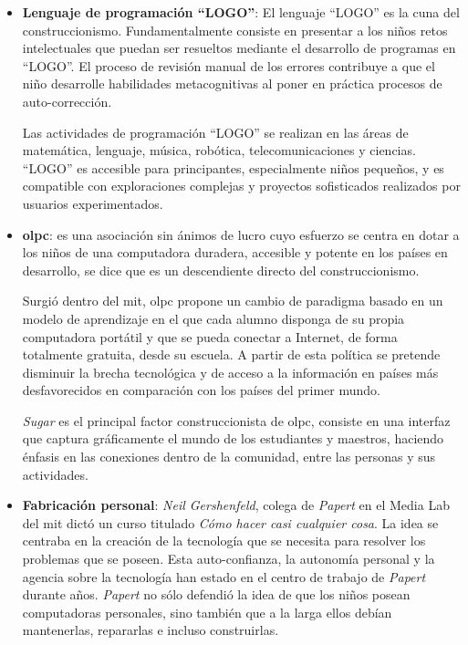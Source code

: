 \begin{itemize}

\item \textbf{Lenguaje de programación \enquote{LOGO}}: El lenguaje
    \enquote{LOGO} es la cuna del construccionismo. Fundamentalmente consiste en
    presentar a los niños retos intelectuales que puedan ser resueltos mediante
    el desarrollo de programas en \enquote{LOGO}. El proceso de revisión manual
    de los errores contribuye a que el niño desarrolle habilidades
    metacognitivas al poner en práctica procesos de
    auto-corrección\cite{logo:sg,ict:ttc}.

    Las actividades de programación \enquote{LOGO} se realizan en las áreas de
    matemática, lenguaje, música, robótica, telecomunicaciones y ciencias.
    \enquote{LOGO} es accesible para principantes, especialmente niños pequeños,
    y es compatible con exploraciones complejas y proyectos sofisticados
    realizados por usuarios experimentados\cite{logo:sg}.
    
\item \textbf{\Gls{olpc}}: es una asociación sin ánimos de lucro cuyo esfuerzo
    se centra en dotar a los niños de una computadora duradera, accesible y
    potente en los países en desarrollo, se dice que es un descendiente directo
    del construccionismo\cite{papertian:const}.
	
    Surgió dentro del \gls{mit}, \Gls{olpc} propone un cambio de paradigma
    basado en un modelo de aprendizaje en el que cada alumno disponga de su
    propia computadora portátil y que se pueda conectar a Internet, de forma
    totalmente gratuita, desde su escuela. A partir de esta política se pretende
    disminuir la brecha tecnológica y de acceso a la información en países más
    desfavorecidos en comparación con los países del primer
    mundo\cite{videojuegos:gonzaleztardon}.
    
    \textit{Sugar} es el principal factor construccionista de \Gls{olpc}, consiste en una 
    interfaz que captura gráficamente el mundo de los estudiantes y maestros, 
    haciendo énfasis en las conexiones dentro de la comunidad, entre las personas y 
    sus actividades\cite{olpc:sugar}.

	
\item \textbf{Fabricación personal}: \textit{Neil Gershenfeld}, colega de
    \textit{Papert} en el Media Lab del \Gls{mit} dictó un curso titulado
    \emph{Cómo hacer casi cualquier cosa}. La idea se centraba en la creación de
    la tecnología que se necesita para resolver los problemas que se poseen.
    Esta auto-confianza, la autonomía personal y la agencia sobre la tecnología
    han estado en el centro de trabajo de \textit{Papert} durante años.
    \textit{Papert} no sólo defendió la idea de que los niños posean
    computadoras personales, sino también que a la larga ellos debían
    mantenerlas, repararlas e incluso construirlas.


\end{itemize}
